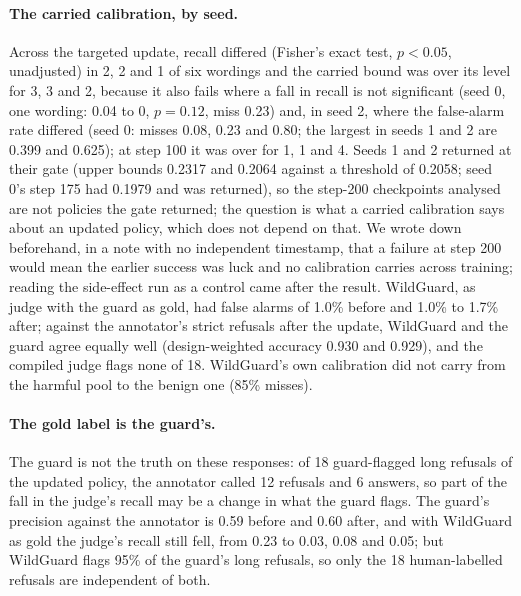 \paragraph{The carried calibration, by seed.} Across the targeted update, recall differed (Fisher's exact test, $p<0.05$, unadjusted) in 2, 2 and 1 of six
wordings and the carried bound was over its level for 3, 3 and 2, because it also fails where a fall in recall is not significant (seed 0, one wording: 0.04 to 0, $p=0.12$, miss 0.23) and, in seed 2, where the false-alarm rate differed (seed 0: misses 0.08, 0.23 and 0.80; the largest in
seeds 1 and 2 are 0.399 and 0.625); at step 100 it was over for 1, 1 and 4. Seeds 1 and 2 returned \NSF{} at their gate
(upper bounds 0.2317 and 0.2064 against a threshold of 0.2058; seed 0's step 175 had 0.1979 and was returned), so the
step-200 checkpoints analysed are not policies the gate returned; the question is what a carried calibration says about
an updated policy, which does not depend on that. We wrote down beforehand, in a note with no independent timestamp, that
a failure at step 200 would mean the earlier success was luck and no calibration carries across training; reading the
side-effect run as a control came after the result. WildGuard, as judge with the guard as gold, had false alarms of 1.0\%
before and 1.0\% to 1.7\% after; against the annotator's strict refusals after the update, WildGuard and the guard agree
equally well (design-weighted accuracy 0.930 and 0.929), and the compiled judge flags none of 18. WildGuard's own
calibration did not carry from the harmful pool to the benign one (85\% misses).

\paragraph{The gold label is the guard's.} The guard is not the truth on these responses: of 18 guard-flagged long refusals of the updated policy, the annotator called 12 refusals and 6 answers, so part of the fall in the judge's recall may be a change in what the guard flags. The guard's precision against the annotator is 0.59 before and 0.60 after, and with WildGuard as gold the judge's recall still fell, from 0.23 to 0.03, 0.08 and 0.05; but WildGuard flags 95\% of the guard's long refusals, so only the 18 human-labelled refusals are independent of both.

